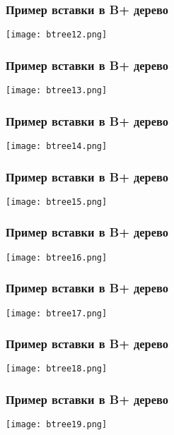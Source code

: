 \begin{frame}
\frametitle{Пример вставки в B+ дерево}
\begin{center}
  \texttt{[image: btree12.png]}
\end{center}
\end{frame}

\begin{frame}
\frametitle{Пример вставки в B+ дерево}
\begin{center}
  \texttt{[image: btree13.png]}
\end{center}
\end{frame}

\begin{frame}
\frametitle{Пример вставки в B+ дерево}
\begin{center}
  \texttt{[image: btree14.png]}
\end{center}
\end{frame}

\begin{frame}
\frametitle{Пример вставки в B+ дерево}
\begin{center}
  \texttt{[image: btree15.png]}
\end{center}
\end{frame}

\begin{frame}
\frametitle{Пример вставки в B+ дерево}
\begin{center}
  \texttt{[image: btree16.png]}
\end{center}
\end{frame}

\begin{frame}
\frametitle{Пример вставки в B+ дерево}
\begin{center}
  \texttt{[image: btree17.png]}
\end{center}
\end{frame}

\begin{frame}
\frametitle{Пример вставки в B+ дерево}
\begin{center}
  \texttt{[image: btree18.png]}
\end{center}
\end{frame}

\begin{frame}
\frametitle{Пример вставки в B+ дерево}
\begin{center}
  \texttt{[image: btree19.png]}
\end{center}
\end{frame}

